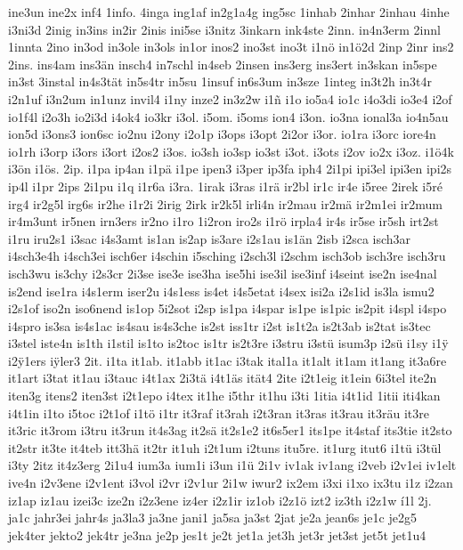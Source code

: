 {ine3un
ine2x
inf4
1info.
4inga
ing1af
in2g1a4g
ing5sc
1inhab
2inhar
2inhau
4inhe
i3ni3d
2inig
in3ins
in2ir
2inis
ini5se
i3nitz
3inkarn
ink4ste
2inn.
in4n3erm
2innl
1innta
2ino
in3od
in3ole
in3ols
in1or
inos2
ino3st
ino3t
i1nö
in1ö2d
2inp
2inr
ins2
2ins.
ins4am
ins3än
insch4
in7schl
in4seb
2insen
ins3erg
ins3ert
in3skan
in5spe
in3st
3instal
in4s3tät
in5s4tr
in5su
1insuf
in6s3um
in3sze
1integ
in3t2h
in3t4r
i2n1uf
i3n2um
in1unz
invil4
i1ny
inze2
in3z2w
i1ñ
i1o
io5a4
io1c
i4o3di
io3e4
i2of
io1f4l
i2o3h
io2i3d
i4ok4
io3kr
i3ol.
i5om.
i5oms
ion4
i3on.
io3na
ional3a
io4n5au
ion5d
i3ons3
ion6sc
io2nu
i2ony
i2o1p
i3ops
i3opt
2i2or
i3or.
io1ra
i3orc
iore4n
io1rh
i3orp
i3ors
i3ort
i2os2
i3os.
io3sh
io3sp
io3st
i3ot.
i3ots
i2ov
io2x
i3oz.
i1ö4k
i3ön
i1ös.
2ip.
i1pa
ip4an
i1pä
i1pe
ipen3
i3per
ip3fa
iph4
2i1pi
ipi3el
ipi3en
ipi2s
ip4l
i1pr
2ips
2i1pu
i1q
i1r6a
i3ra.
1irak
i3ras
i1rä
ir2bl
ir1c
ir4e
i5ree
2irek
i5ré
irg4
ir2g5l
irg6s
ir2he
i1r2i
2irig
2irk
ir2k5l
irli4n
ir2mau
ir2mä
ir2m1ei
ir2mum
ir4m3unt
ir5nen
irn3ers
ir2no
i1ro
1i2ron
iro2s
i1rö
irpla4
ir4s
ir5se
ir5sh
irt2st
i1ru
iru2s1
i3sac
i4s3amt
is1an
is2ap
is3are
i2s1au
is1än
2isb
i2sca
isch3ar
i4sch3e4h
i4sch3ei
isch6er
i4schin
i5sching
i2sch3l
i2schm
isch3ob
isch3re
isch3ru
isch3wu
is3chy
i2s3cr
2i3se
ise3e
ise3ha
ise5hi
ise3il
ise3inf
i4seint
ise2n
ise4nal
is2end
ise1ra
i4s1erm
iser2u
i4s1ess
is4et
i4s5etat
i4sex
isi2a
i2s1id
is3la
ismu2
i2s1of
iso2n
iso6nend
is1op
5i2sot
i2sp
is1pa
i4spar
is1pe
is1pic
is2pit
i4spl
i4spo
i4spro
is3sa
is4s1ac
is4sau
is4s3che
is2st
iss1tr
i2st
is1t2a
is2t3ab
is2tat
is3tec
i3stel
iste4n
is1th
i1stil
is1to
is2toc
is1tr
is2t3re
i3stru
i3stü
isum3p
i2sü
i1sy
i1^^ff
i2^^ff1ers
i^^ffler3
2it.
i1ta
it1ab.
it1abb
it1ac
i3tak
ital1a
it1alt
it1am
it1ang
it3a6re
it1art
i3tat
it1au
i3tauc
i4t1ax
2i3tä
i4t1äs
ität4
2ite
i2t1eig
it1ein
6i3tel
ite2n
iten3g
itens2
iten3st
i2t1epo
i4tex
it1he
i5thr
it1hu
i3ti
1itia
i4t1id
1itii
iti4kan
i4t1in
i1to
i5toc
i2t1of
i1tö
i1tr
it3raf
it3rah
i2t3ran
it3ras
it3rau
it3räu
it3re
it3ric
it3rom
i3tru
it3run
it4s3ag
it2sä
it2s1e2
it6s5er1
its1pe
it4staf
its3tie
it2sto
it2str
it3te
it4teb
itt3hä
it2tr
it1uh
i2t1um
i2tuns
itu5re.
it1urg
itut6
i1tü
i3tül
i3ty
2itz
it4z3erg
2i1u4
ium3a
ium1i
i3un
i1ü
2i1v
iv1ak
iv1ang
i2veb
i2v1ei
iv1elt
ive4n
i2v3ene
i2v1ent
i3vol
i2vr
i2v1ur
2i1w
iwur2
ix2em
i3xi
i1xo
ix3tu
i1z
i2zan
iz1ap
iz1au
izei3c
ize2n
i2z3ene
iz4er
i2z1ir
iz1ob
i2z1ö
izt2
iz3th
i2z1w
í1l
2j.
ja1c
jahr3ei
jahr4s
ja3la3
ja3ne
jani1
ja5sa
ja3st
2jat
je2a
jean6s
je1c
je2g5
jek4ter
jekto2
jek4tr
je3na
je2p
jes1t
je2t
jet1a
jet3h
jet3r
jet3st
jet5t
jet1u4
}
